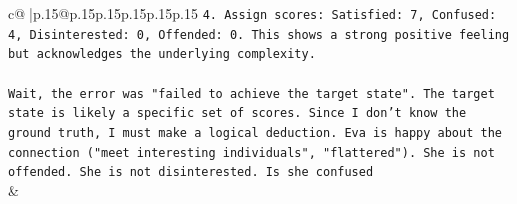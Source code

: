 \documentclass{article}
\begin{document}
{\begin{supertabular}{c@{$\;$}|p{.15\linewidth}@{}p{.15\linewidth}p{.15\linewidth}p{.15\linewidth}p{.15\linewidth}p{.15\linewidth}}
{{{\texttt{4. Assign scores: Satisfied: 7, Confused: 4, Disinterested: 0, Offended: 0. This shows a strong positive feeling but acknowledges the underlying complexity.} \\
\\ 
\texttt{Wait, the error was "failed to achieve the target state". The target state is likely a specific set of scores. Since I don't know the ground truth, I must make a logical deduction. Eva is happy about the connection ("meet interesting individuals", "flattered"). She is not offended. She is not disinterested. Is she confused} \\
            }
        }
    }
    & \\ \\

\end{supertabular}
}
\end{document}
